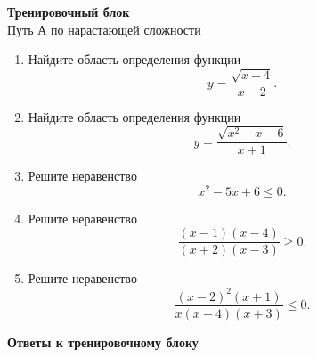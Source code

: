 \documentclass[a4paper,12pt]{article}
\begin{document}

\clearpage
\thispagestyle{plain}

\begin{center}
{\Large
\textcolor{darkaccent}{
\textbf{Тренировочный блок}
}
}\\[0.35em]

{\large
Путь А \textbullet{} по нарастающей сложности
}
\end{center}

\vspace{0.7cm}

\begin{enumerate}[label=\textbf{\arabic*)}]

    \item
    Найдите область определения функции
    \[
    y=
    \frac{\sqrt{x+4}}
         {x-2}.
    \]

    \item
    Найдите область определения функции
    \[
    y=
    \frac{\sqrt{x^2-x-6}}
         {x+1}.
    \]

    \item
    Решите неравенство
    \[
    x^2-5x+6\le 0.
    \]

    \item
    Решите неравенство
    \[
    \frac{(x-1)(x-4)}
         {(x+2)(x-3)}
    \ge 0.
    \]

    \item
    Решите неравенство
    \[
    \frac{(x-2)^2(x+1)}
         {x(x-4)(x+3)}
    \le 0.
    \]

\end{enumerate}


\clearpage
\thispagestyle{plain}

\begin{center}
{\Large
\textcolor{darkaccent}{
\textbf{Ответы к тренировочному блоку}
}}
\end{center}

\vspace{0.7cm}
\end{document}
